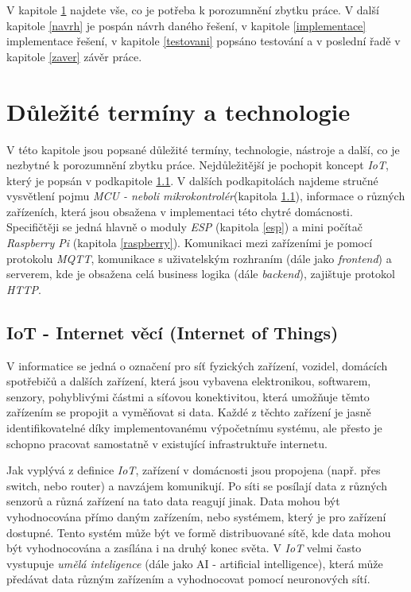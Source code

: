V kapitole \ref{terminy} najdete vše, co je potřeba k porozumnění zbytku práce. V další kapitole \ref{navrh} je pospán návrh daného řešení, v kapitole \ref{implementace} implementace řešení, v kapitole \ref{testovani} popsáno testování a v poslední řadě v kapitole \ref{zaver} závěr práce.

\chapter{Důležité termíny a technologie}
\label{terminy}

V této kapitole jsou popsané důležité termíny, technologie, nástroje a další, co je nezbytné k porozumnění zbytku práce. Nejdůležitější je pochopit koncept \emph{IoT}, který je popsán v podkapitole \ref{terminy:iot}.
V dalších podkapitolách najdeme stručné vysvětlení pojmu \emph{MCU - neboli mikrokontrolér}(kapitola \ref{terminy:iot}), informace o různých zařízeních, která jsou obsažena v implementaci této chytré domácnosti. Specifičtěji se jedná hlavně o moduly \emph{ESP} (kapitola \ref{esp}) a mini počítač \emph{Raspberry Pi} (kapitola \ref{raspberry}).
Komunikaci mezi zařízeními je pomocí protokolu \emph{MQTT}, komunikace s uživatelským rozhraním (dále jako \emph{frontend}) a serverem, kde je obsažena celá business logika (dále \emph{backend}), zajištuje protokol \emph{HTTP}.

\bigskip

\section{IoT - Internet věcí (Internet of Things)}
\label{terminy:iot}

V informatice se jedná o označení pro síť fyzických zařízení, vozidel, domácích spotřebičů a dalších zařízení, která jsou vybavena elektronikou,
softwarem, senzory, pohyblivými částmi a síťovou konektivitou, která umožňuje těmto zařízením se propojit a vyměňovat si data.
Každé z těchto zařízení je jasně identifikovatelné díky implementovanému výpočetnímu systému,
ale přesto je schopno pracovat samostatně v existující infrastruktuře internetu.~\cite{wiki:iot}

Jak vyplývá z definice \emph{IoT}, zařízení v domácnosti jsou propojena (např. přes switch, nebo router) a navzájem komunikují. Po síti se posílají data z různých senzorů a různá zařízení na tato data reagují jinak.
Data mohou být vyhodnocována přímo daným zařízením, nebo systémem, který je pro zařízení dostupné. Tento systém může být ve formě distribuované sítě, kde data mohou být vyhodnocována a zasílána i na druhý konec světa.
V \emph{IoT} velmi často vystupuje \emph{umělá inteligence} (dále jako AI - artificial intelligence), která může předávat data různým zařízením a vyhodnocovat pomocí neuronových sítí.

